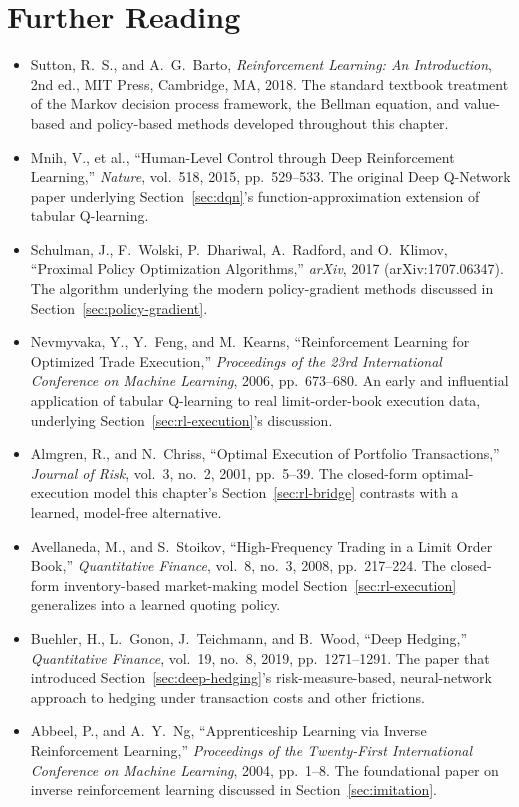 \documentclass[../ai_in_finance]{subfiles}
\begin{document}
\section{Further Reading}

\begin{itemize}
    \item Sutton, R.\ S., and A.\ G.\ Barto, \emph{Reinforcement Learning: An Introduction}, 2nd ed., MIT Press, Cambridge, MA, 2018. The standard textbook treatment of the Markov decision process framework, the Bellman equation, and value-based and policy-based methods developed throughout this chapter.
    \item Mnih, V., et al., ``Human-Level Control through Deep Reinforcement Learning,'' \emph{Nature}, vol.\ 518, 2015, pp.\ 529--533. The original Deep Q-Network paper underlying Section~\ref{sec:dqn}'s function-approximation extension of tabular Q-learning.
    \item Schulman, J., F.\ Wolski, P.\ Dhariwal, A.\ Radford, and O.\ Klimov, ``Proximal Policy Optimization Algorithms,'' \emph{arXiv}, 2017 (arXiv:1707.06347). The algorithm underlying the modern policy-gradient methods discussed in Section~\ref{sec:policy-gradient}.
    \item Nevmyvaka, Y., Y.\ Feng, and M.\ Kearns, ``Reinforcement Learning for Optimized Trade Execution,'' \emph{Proceedings of the 23rd International Conference on Machine Learning}, 2006, pp.\ 673--680. An early and influential application of tabular Q-learning to real limit-order-book execution data, underlying Section~\ref{sec:rl-execution}'s discussion.
    \item Almgren, R., and N.\ Chriss, ``Optimal Execution of Portfolio Transactions,'' \emph{Journal of Risk}, vol.\ 3, no.\ 2, 2001, pp.\ 5--39. The closed-form optimal-execution model this chapter's Section~\ref{sec:rl-bridge} contrasts with a learned, model-free alternative.
    \item Avellaneda, M., and S.\ Stoikov, ``High-Frequency Trading in a Limit Order Book,'' \emph{Quantitative Finance}, vol.\ 8, no.\ 3, 2008, pp.\ 217--224. The closed-form inventory-based market-making model Section~\ref{sec:rl-execution} generalizes into a learned quoting policy.
    \item Buehler, H., L.\ Gonon, J.\ Teichmann, and B.\ Wood, ``Deep Hedging,'' \emph{Quantitative Finance}, vol.\ 19, no.\ 8, 2019, pp.\ 1271--1291. The paper that introduced Section~\ref{sec:deep-hedging}'s risk-measure-based, neural-network approach to hedging under transaction costs and other frictions.
    \item Abbeel, P., and A.\ Y.\ Ng, ``Apprenticeship Learning via Inverse Reinforcement Learning,'' \emph{Proceedings of the Twenty-First International Conference on Machine Learning}, 2004, pp.\ 1--8. The foundational paper on inverse reinforcement learning discussed in Section~\ref{sec:imitation}.
\end{itemize}
\end{document}
